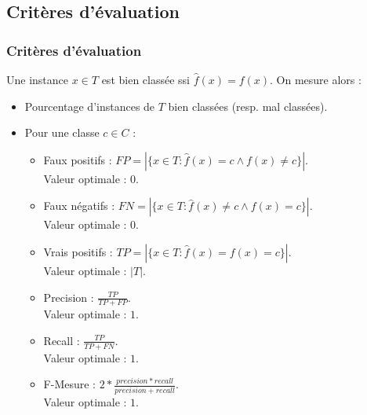   \subsection{Critères d'évaluation}
  \begin{frame}
   \frametitle{Critères d'évaluation}
Une instance $x \in T$ est bien classée ssi $\hat{f}(x) = f(x)$. On mesure alors : 
\begin{itemize}
 \item Pourcentage d'instances de $T$ bien classées (resp. mal classées).
 \item Pour une classe $c \in C$ : 
    \begin{itemize}
      \item Faux positifs : $FP = |\{x \in T : \hat{f}(x) = c \wedge f(x) \neq c\}|$. \\
	Valeur optimale : $0$.
      \item Faux négatifs : $FN = |\{x \in T : \hat{f}(x) \neq c \wedge f(x) = c\}|$. \\
	Valeur optimale : $0$.
      \item Vrais positifs : $TP = |\{x \in T : \hat{f}(x) = f(x) = c\}|$. \\
	Valeur optimale : $|T|$.
      \item Precision : $\frac{TP}{TP + FP}$. \\
	Valeur optimale : $1$.
      \item Recall : $\frac{TP}{TP + FN}$. \\
	Valeur optimale : $1$.
      \item F-Mesure : $2 * \frac{precision * recall}{precision + recall}$. \\
	Valeur optimale : $1$.
    \end{itemize}
\end{itemize}


  \end{frame}
